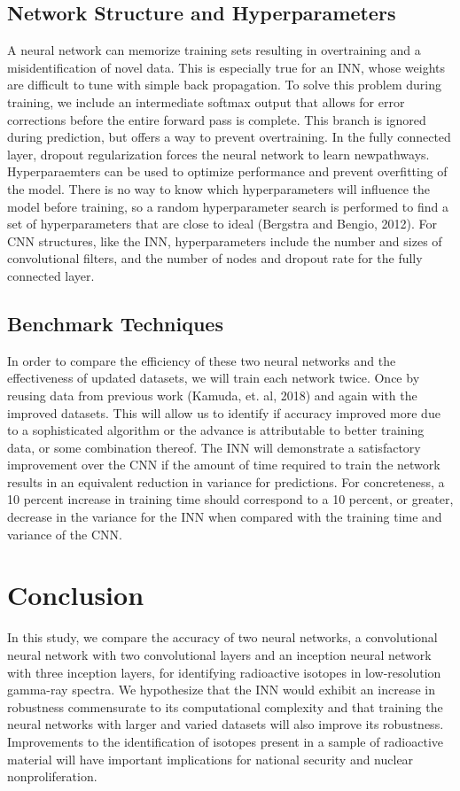 \documentclass{anstrans}
\begin{document}
\subsection{Network Structure and Hyperparameters}
A neural network can memorize training sets resulting in overtraining and a misidentification of novel data. 
This is especially true for an INN, whose weights are difficult to tune with simple back propagation.
To solve this problem during training, we include an intermediate softmax output that allows for error corrections before the entire forward pass is complete. 
This branch is ignored during prediction, but offers a way to prevent overtraining. 
In the fully connected layer, dropout regularization forces the neural network to learn newpathways. 
Hyperparaemters can be used to optimize performance and prevent overfitting of the model.
There is no way to know which hyperparameters will influence the model before training, so a random hyperparameter search is performed to find a set of hyperparameters that are close to ideal (Bergstra and Bengio, 2012). 
For CNN structures, like the INN, hyperparameters include the number and sizes of convolutional filters, and the number of nodes and dropout rate for the fully connected layer. 
\subsection{Benchmark Techniques}
In order to compare the efficiency of these two neural networks and the effectiveness of updated datasets, we will train each network twice. 
Once by reusing data from previous work (Kamuda, et. al,  2018) and again with the improved datasets. 
This will allow us to identify if accuracy improved more due to a sophisticated algorithm or the advance is attributable to better training data, or some combination thereof. 
The INN will demonstrate a satisfactory improvement over the CNN if the amount of time required to train the network results in an equivalent reduction in variance for predictions. 
For concreteness, a 10 percent increase in training time should correspond to a 10 percent, or greater, decrease in the variance for the INN when compared with the training time and variance of the CNN.

\section{Conclusion}

In this study, we compare the accuracy of two neural networks, a convolutional neural network with two convolutional layers and an inception neural network with three inception layers, for identifying radioactive isotopes in low-resolution gamma-ray spectra. 
We hypothesize that the INN would exhibit an increase in robustness commensurate to its computational complexity and that training the neural networks with larger and varied datasets will also improve its robustness. 
Improvements to the identification of isotopes present in a sample of radioactive material will have important implications for national security and nuclear nonproliferation.
\end{document}
